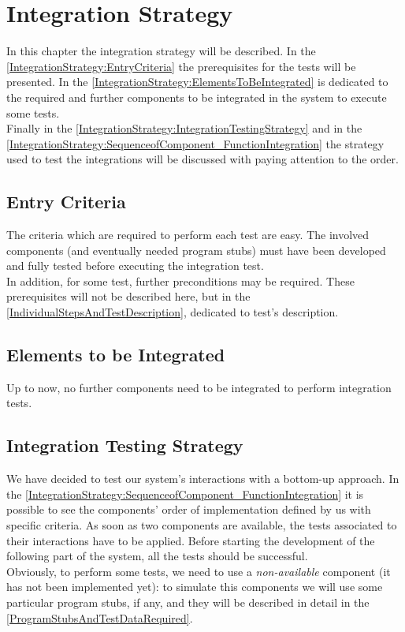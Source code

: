 \documentclass[\mainpath/main]{subfiles}
\begin{document}
\chapter{Integration Strategy} %
\label{IntegrationStrategy}

\setmyfancystyle

In this chapter the integration strategy will be described. In the \autoref{IntegrationStrategy:EntryCriteria} the prerequisites for the tests will be presented. In the \autoref{IntegrationStrategy:ElementsToBeIntegrated} is dedicated to the required and further components to be integrated in the system to execute some tests.\\
Finally in the \autoref{IntegrationStrategy:IntegrationTestingStrategy} and in the \autoref{IntegrationStrategy:SequenceofComponent_FunctionIntegration} the strategy used to test the integrations will be discussed with paying attention to the order.

\section{Entry Criteria}
\label{IntegrationStrategy:EntryCriteria}
The criteria which are required to perform each test are easy. The involved components (and eventually needed program stubs) must have been developed and fully tested before executing the integration test.\\
In addition, for some test, further preconditions may be required. These prerequisites will not be described here, but in the \autoref{IndividualStepsAndTestDescription}, dedicated to test's description.

\section{Elements to be Integrated}
\label{IntegrationStrategy:ElementsToBeIntegrated}
Up to now, no further components need to be integrated to perform integration tests.

\section{Integration Testing Strategy}
\label{IntegrationStrategy:IntegrationTestingStrategy}
We have decided to test our system's interactions with a bottom-up approach. In the \autoref{IntegrationStrategy:SequenceofComponent_FunctionIntegration} it is possible to see the components' order of implementation defined by us with specific criteria. As soon as two components are available, the tests associated to their interactions have to be applied. Before starting the development of the following part of the system, all the tests should be successful.\\ Obviously, to perform some tests, we need to use a \textit{non-available} component (it has not been implemented yet): to simulate this components we will use some particular program stubs, if any, and they will be described in detail in the \autoref{ProgramStubsAndTestDataRequired}.
\end{document}
